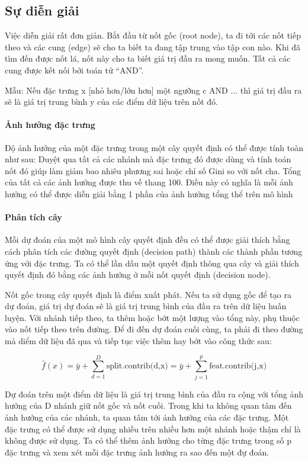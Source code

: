 \subsection{Sự diễn giải}
Việc diễn giải rất đơn giản. Bắt đầu từ nốt gốc (root node), ta đi tới các nốt tiếp theo và các cung (edge) sẽ cho ta biết ta đang tập trung vào tập con nào. Khi đã tìm đến được nốt lá, nốt này cho ta biết giá trị đầu ra mong muốn. Tất cả các cung được kết nối bởi toán tử ``AND''.

Mẫu: Nếu đặc trưng x [nhỏ hơn/lớn hơn] một ngưỡng c AND ... thì giá trị đầu ra sẽ là giá trị trung bình y của các điểm dữ liệu trên nốt đó.

\paragraph{Ảnh hưởng đặc trưng}

Độ ảnh hưởng của một đặc trưng trong một cây quyết định có thể được tính toàn như sau: Duyệt qua tất cả các nhánh mà đặc trưng đó được dùng và tính toán nốt đó giúp làm giảm bao nhiêu phương sai hoặc chỉ số Gini so với nốt cha. Tổng của tất cả các ảnh hưởng được thu về thang 100. Điều này có nghĩa là mỗi ảnh hưởng có thể được diễn giải bằng 1 phần của ảnh hưởng tổng thể trên mô hình

\paragraph{Phân tích cây}

Mỗi dự đoán của một mô hình cây quyết định đều có thể được giải thích bằng cách phân tích các đường quyết định (decision path) thành các thành phần tương ứng với đặc trưng. Ta có thể lần dấu một quyết định thông qua cây và giải thích quyết định đó bằng các ảnh hưởng ở mỗi nốt quyết định (decision node).

Nốt gốc trong cây quyết định là điểm xuất phát. Nếu ta sử dụng gốc để tạo ra dự đoán, giá trị dự đoán sẽ là giá trị trung bình của đầu ra trên dữ liệu huấn luyện. Với nhánh tiếp theo, ta thêm hoặc bớt một lượng vào tổng này, phụ thuộc vào nốt tiếp theo trên đường. Để đi đến dự đoán cuối cùng, ta phải đi theo đường mà diểm dữ liệu đã qua và tiếp tục việc thêm hay bớt vào công thức sau:

$$\hat{f}(x)=\bar{y}+\sum_{d=1}^D\text{split.contrib(d,x)}=\bar{y}+\sum_{j=1}^p\text{feat.contrib(j,x)}$$

Dự đoán trên một điểm dữ liệu là giá trị trung bình của đầu ra cộng với tổng ảnh hưởng của D nhánh giữ nốt gốc và nốt cuối. Trong khi ta không quan tâm đến ảnh hưởng của các nhánh, ta quan tâm tới ảnh hưởng của các đặc trưng. Một đặc trưng có thể được sử dụng nhiều trên nhiều hơn một nhánh hoặc thậm chí là không được sử dụng. Ta có thể thêm  ảnh hưởng cho từng đặc trưng trong số p đặc trưng và xem xét mỗi đặc trưng ảnh hưởng ra sao đến một đự đoán.


